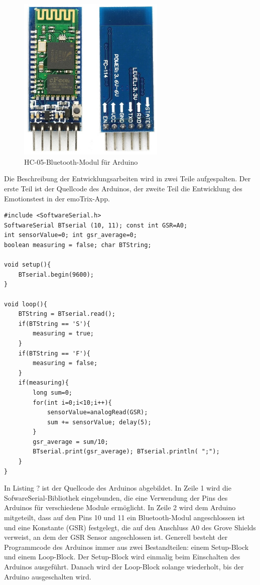 \begin{figure}[h]
	\centering
	\includegraphics[width=7cm]{Bilder/hc05.jpg}
	\caption[HC-05-Bluetooth-Modul für Arduino]{HC-05-Bluetooth-Modul für Arduino\footnotemark}
\end{figure}%
\newline
Die Beschreibung der Entwicklungsarbeiten wird in zwei Teile aufgespalten. Der erste Teil ist der Quellcode des Arduinos, der zweite Teil die Entwicklung des Emotionstest in der emoTrix-App. \newline
\begin{lstlisting}[caption={Quellcode des Arduinos},style=Arduino]
#include <SoftwareSerial.h>
SoftwareSerial BTserial (10, 11); const int GSR=A0;
int sensorValue=0; int gsr_average=0;
boolean measuring = false; char BTString;

void setup(){
	BTserial.begin(9600);
}

void loop(){
	BTString = BTserial.read();
	if(BTString == 'S'){
		measuring = true;
	}
	if(BTString == 'F'){
		measuring = false;
	}
	if(measuring){
		long sum=0;
		for(int i=0;i<10;i++){ 
			sensorValue=analogRead(GSR);
			sum += sensorValue; delay(5);
		}
		gsr_average = sum/10;
		BTserial.print(gsr_average); BTserial.println( ";");
	}
}
\end{lstlisting}
In Listing ? ist der Quellcode des Arduinos abgebildet. In Zeile 1 wird die SofwareSerial-Bibliothek eingebunden, die eine Verwendung der Pins des Arduinos für verschiedene Module ermöglicht. In Zeile 2 wird dem Arduino mitgeteilt, dass auf den Pins 10 und 11 ein Bluetooth-Modul angeschlossen ist und eine Konstante (GSR) festgelegt, die auf den Anschluss A0 des Grove Shields verweist, an dem der GSR Sensor angeschlossen ist. \newline
Generell besteht der Programmcode des Arduinos immer aus zwei Bestandteilen: einem Setup-Block und einem Loop-Block. Der Setup-Block wird einmalig beim Einschalten des Arduinos ausgeführt. Danach wird der Loop-Block solange wiederholt, bis der Arduino ausgeschalten wird. 
